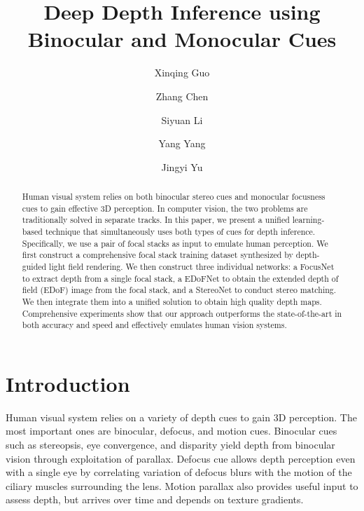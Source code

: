 \documentclass[10pt,twocolumn,letterpaper]{article}
\begin{document}
\title{Deep Depth Inference using Binocular and Monocular Cues}

\renewcommand\Authands{ and }

\author[1]{Xinqing Guo}
\author[2]{Zhang Chen}
\author[2]{Siyuan Li}
\author[1]{Yang Yang}
\author[2]{Jingyi Yu}

\maketitle


\begin{abstract}
Human visual system relies on both binocular stereo cues and monocular
focusness cues to gain effective 3D perception. In computer vision,
the two problems are traditionally solved in separate tracks. In this
paper, we present a unified learning-based technique that simultaneously uses
both types of cues for depth inference. Specifically, we use a pair of
focal stacks as input to emulate human perception. We first construct
a comprehensive focal stack training dataset synthesized by
depth-guided light field rendering. We then construct three individual
networks: a FocusNet to extract depth from a single focal
stack, a EDoFNet to obtain the extended depth of field (EDoF)
image from the focal stack,  and a StereoNet to conduct stereo
matching. We then integrate them into a unified solution to
obtain high quality depth maps. Comprehensive experiments show that
our approach outperforms the state-of-the-art in both accuracy and
speed and effectively emulates human vision systems.


\end{abstract}

\section{Introduction}
Human visual system relies on a variety of depth cues to gain 3D perception. The most important ones are binocular, defocus, and motion cues. Binocular cues such as stereopsis, eye convergence, and disparity yield depth from binocular vision through exploitation of parallax. Defocus cue allows depth perception even with a single eye by correlating variation of defocus blurs with the motion of the ciliary muscles surrounding the lens.  Motion parallax also provides useful input to assess depth, but arrives over time and depends on texture gradients.
\end{document}
